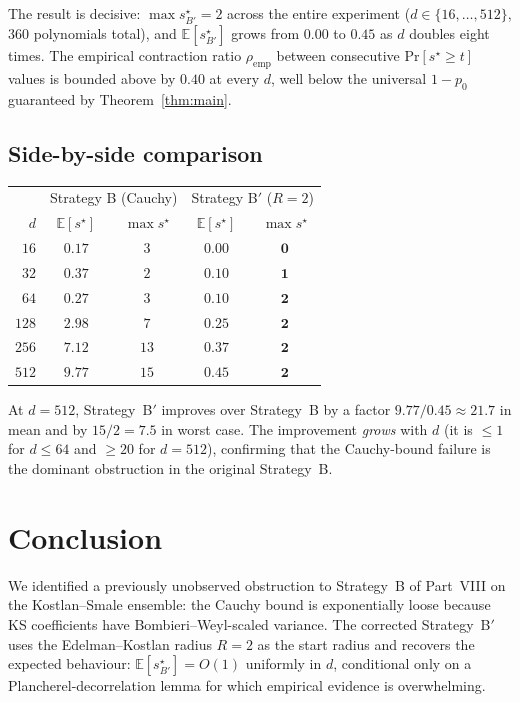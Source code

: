 \documentclass[11pt,a4paper]{article}
\begin{document}
The result is decisive: $\max s^\star_{B'} = 2$ across the entire experiment ($d \in \{16, \dots, 512\}$, 360 polynomials total), and $\mathbb{E}[s^\star_{B'}]$ grows from $0.00$ to $0.45$ as $d$ doubles eight times. The empirical contraction ratio $\rho_{\text{emp}}$ between consecutive Pr$[s^\star \ge t]$ values is bounded above by $0.40$ at every $d$, well below the universal $1 - p_0$ guaranteed by Theorem~\ref{thm:main}.

\subsection{Side-by-side comparison}

\begin{center}
\begin{tabular}{rcc|cc}
\toprule
& \multicolumn{2}{c|}{Strategy B (Cauchy)} & \multicolumn{2}{c}{Strategy B$'$ ($R = 2$)} \\
$d$ & $\mathbb{E}[s^\star]$ & $\max s^\star$ & $\mathbb{E}[s^\star]$ & $\max s^\star$ \\
\midrule
$16$  & $0.17$ & $3$  & $\mathbf{0.00}$ & $\mathbf{0}$ \\
$32$  & $0.37$ & $2$  & $\mathbf{0.10}$ & $\mathbf{1}$ \\
$64$  & $0.27$ & $3$  & $\mathbf{0.10}$ & $\mathbf{2}$ \\
$128$ & $2.98$ & $7$  & $\mathbf{0.25}$ & $\mathbf{2}$ \\
$256$ & $7.12$ & $13$ & $\mathbf{0.37}$ & $\mathbf{2}$ \\
$512$ & $9.77$ & $15$ & $\mathbf{0.45}$ & $\mathbf{2}$ \\
\bottomrule
\end{tabular}
\end{center}

At $d = 512$, Strategy~B$'$ improves over Strategy~B by a factor $9.77/0.45 \approx 21.7$ in mean and by $15/2 = 7.5$ in worst case. The improvement \emph{grows} with $d$ (it is $\le 1$ for $d \le 64$ and $\ge 20$ for $d = 512$), confirming that the Cauchy-bound failure is the dominant obstruction in the original Strategy~B.

\section{Conclusion}\label{sec:conclusion}

We identified a previously unobserved obstruction to Strategy~B of Part~VIII on the Kostlan--Smale ensemble: the Cauchy bound is exponentially loose because KS coefficients have Bombieri--Weyl-scaled variance. The corrected Strategy~B$'$ uses the Edelman--Kostlan radius $R = 2$ as the start radius and recovers the expected behaviour: $\mathbb{E}[s^\star_{B'}] = O(1)$ uniformly in $d$, conditional only on a Plancherel-decorrelation lemma for which empirical evidence is overwhelming.
\end{document}
